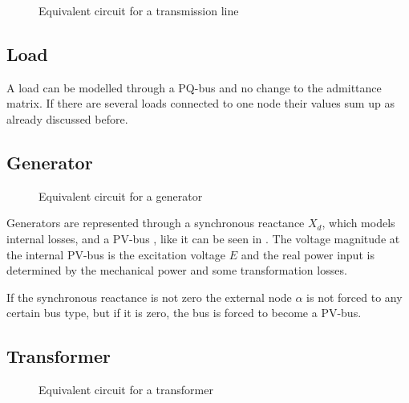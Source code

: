 \begin{figure}
	\centering
	
	\caption{Equivalent circuit for a transmission line}
	\label{fig:transmission_line}
\end{figure}

\subsection{Load}
A load can be modelled through a PQ-bus and no change to the admittance matrix. If there are several loads connected to one node their values sum up as already discussed before.

\subsection{Generator}

\begin{figure}
	\centering
	
	\caption{Equivalent circuit for a generator}
	\label{fig:generator}
\end{figure}

Generators are represented through a synchronous reactance $X_d$, which models internal losses, and a PV-bus \citep[p. 55]{powerSystemAnalysis}, like it can be seen in . The voltage magnitude at the internal PV-bus is the excitation voltage $E$ and the real power input is determined by the mechanical power and some transformation losses. 

If the synchronous reactance is not zero the external node $\alpha$ is not forced to any certain bus type, but if it is zero, the bus is forced to become a PV-bus.

\subsection{Transformer}

\begin{figure}
	\centering
	
	\caption{Equivalent circuit for a transformer}
	\label{fig:transformer}
\end{figure}

